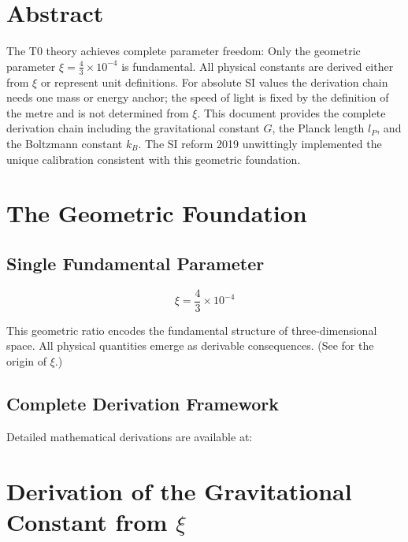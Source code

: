 \section*{Abstract}
		The T0 theory achieves complete parameter freedom: Only the geometric parameter $\xi = \frac{4}{3} \times 10^{-4}$ is fundamental. All physical constants are derived either from $\xi$ or represent unit definitions. For absolute SI values the derivation chain needs one mass or energy anchor; the speed of light is fixed by the definition of the metre and is not determined from $\xi$. This document provides the complete derivation chain including the gravitational constant $G$, the Planck length $l_P$, and the Boltzmann constant $k_B$. The SI reform 2019 unwittingly implemented the unique calibration consistent with this geometric foundation.

	
	
	
	
	\section{The Geometric Foundation}
	
	\subsection{Single Fundamental Parameter}
	
	\begin{equation}
		\boxed{\xi = \frac{4}{3} \times 10^{-4}}
	\end{equation}
	
	This geometric ratio encodes the fundamental structure of three-dimensional space. All physical quantities emerge as derivable consequences. (See \cite{T0_xi_origin_En} for the origin of $\xi$.)
	
	\subsection{Complete Derivation Framework}
	
	Detailed mathematical derivations are available at:
	
	\begin{center}
		
	\end{center}
	
	\section{Derivation of the Gravitational Constant from $\xi$}
	

